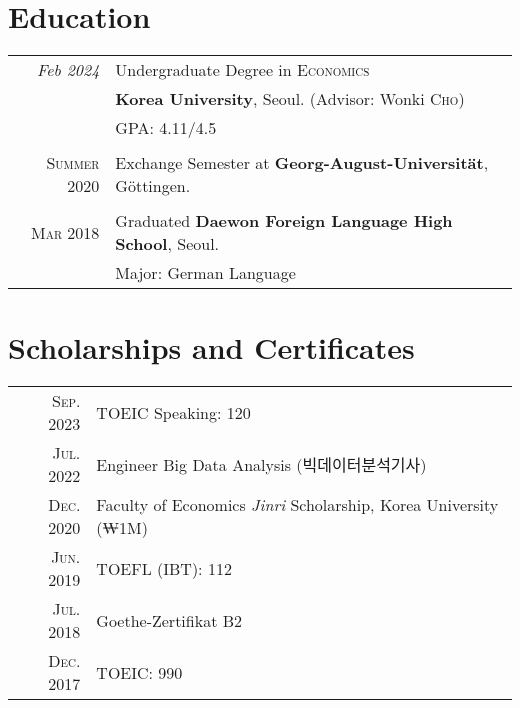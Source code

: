 \documentclass[a4paper,10pt]{article} %
\begin{document}

\section{Education}

\begin{tabular}{rl}	

\emph{Feb 2024} & Undergraduate Degree in \textsc{}\textsc{Economics}
\\& \normalsize\textbf{Korea University}, Seoul.
\small (Advisor: Wonki \textsc{Cho})\\
&\normalsize \textsc{GPA}: 4.11/4.5 \\
&\\


\textsc{Summer} 2020 & Exchange Semester at \textbf{Georg-August-Universität},
Göttingen.\\
&\\


\textsc{Mar} 2018& Graduated \textbf{Daewon
Foreign Language High School}, Seoul.\\
&Major: German Language\\
\end{tabular}


\section{Scholarships and Certificates}

\begin{tabular}{rl}
    \textsc{Sep.} 2023 & TOEIC Speaking: 120 \\

\textsc{Jul.} 2022 & Engineer Big Data Analysis (빅데이터분석기사)\\

\textsc{Dec.} 2020 & Faculty of Economics \textit{Jinri} Scholarship, Korea
University
\footnotesize(₩1M)\normalsize\\

\textsc{Jun.} 2019 & TOEFL (IBT): 112\\

\textsc{Jul.} 2018 & Goethe-Zertifikat B2\\

\textsc{Dec.} 2017 & TOEIC: 990\\
\end{tabular}
\end{document}
